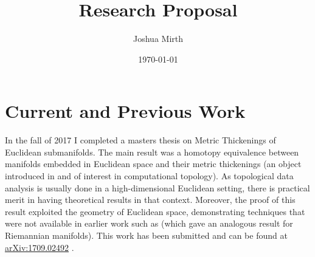 \documentclass[11pt]{amsart}
\title{Research Proposal}
\author{Joshua Mirth}
\date{\today}
\begin{document}
\maketitle 

\section{Current and Previous Work}

In the fall of 2017 I completed a masters thesis on Metric Thickenings of Euclidean submanifolds.
The main result was a homotopy equivalence between manifolds embedded in Euclidean space and their metric thickenings (an object introduced in \cite{AdamaszekMetricreconstructionoptimal2017} and of interest in computational topology).
As topological data analysis is usually done in a high-dimensional Euclidean setting, there is practical merit in having theoretical results in that context. 
Moreover, the proof of this result exploited the geometry of Euclidean space, demonstrating techniques that were not available in earlier work such as \cite{AdamaszekMetricreconstructionoptimal2017} (which gave an analogous result for Riemannian manifolds).
This work has been submitted and can be found at \href{https://arxiv.org/abs/1709.02492}{arXiv:1709.02492} \cite{AdamsMetricthickeningsEuclidean2017}.
\end{document}
